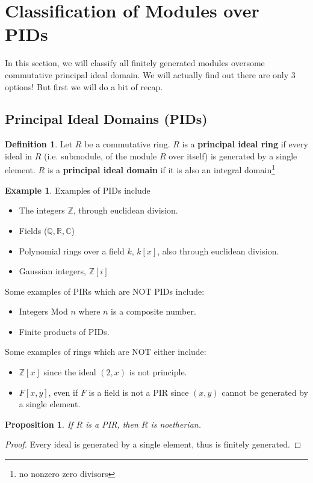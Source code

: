 \documentclass[12pt]{book}
\newtheorem{proposition}[theorem]{Proposition}
\theoremstyle{definition}
\newtheorem{definition}[theorem]{Definition}
\newtheorem{example}[theorem]{Example}
\begin{document}
\section{Classification of Modules over PIDs}
In this section, we will classify all finitely generated modules oversome commutative principal ideal domain. We will actually find out there are only 3 options! But first we will do a bit of recap. 
\subsection{Principal Ideal Domains (PIDs)}
\begin{definition}
    Let $R$ be a commutative ring. $R$ is a \textbf{principal ideal ring} if every ideal in $R$ (i.e. submodule, of the module $R$ over itself) is generated by a single element. $R$ is a \textbf{principal ideal domain} if it is also an integral domain\footnote{no nonzero zero divisors}
\end{definition}

\begin{example}
    Examples of PIDs include 
    \begin{itemize}
        \item The integers $\mathbb{Z}$, through euclidean division. 
        \item Fields ($\mathbb{Q}, \mathbb{R}, \mathbb{C}$)
        \item Polynomial rings over a field $k$, $k[x]$, also through euclidean division. 
        \item Gaussian integers, $\mathbb{Z}[i]$
    \end{itemize}
    Some examples of PIRs which are NOT PIDs include: 
    \begin{itemize}
        \item Integers Mod $n$ where $n$ is a composite number. 
        \item Finite products of PIDs. 
    \end{itemize}
    Some examples of rings which are NOT either include: 
    \begin{itemize}
        \item $\mathbb{Z}[x]$ since the ideal $(2,x)$ is not principle. 
        \item $F[x,y]$, even if $F$ is a field is not a PIR since $(x,y)$ cannot be generated by a single element. 
    \end{itemize}
\end{example}

\begin{proposition}
    If $R$ is a PIR, then $R$ is noetherian. 
\end{proposition}
\begin{proof}
    Every ideal is generated by a single element, thus is finitely generated.
\end{proof}
\end{document}
